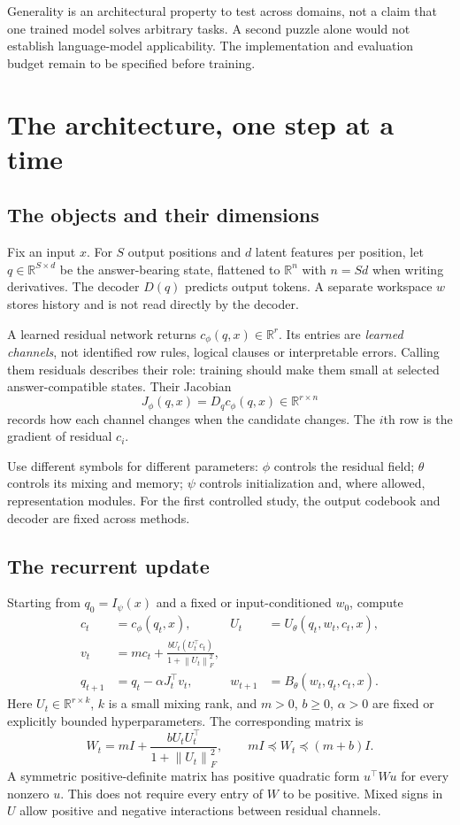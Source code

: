 \documentclass[11pt,a4paper]{article}
\newcommand{\norm}[1]{\left\lVert #1\right\rVert}
\newcommand{\newtopic}{\clearpage}
\begin{document}
Generality is an architectural property to test across domains, not a claim that one trained model solves arbitrary tasks. A second puzzle alone would not establish language-model applicability. The implementation and evaluation budget remain to be specified before training.


\newtopic
\section{The architecture, one step at a time}\label{sec:architecture}
\subsection{The objects and their dimensions}
Fix an input $x$. For $S$ output positions and $d$ latent features per position, let $q\in\mathbb R^{S\times d}$ be the answer-bearing state, flattened to $\mathbb R^n$ with $n=Sd$ when writing derivatives. The decoder $D(q)$ predicts output tokens. A separate workspace $w$ stores history and is not read directly by the decoder.

A learned residual network returns $c_\phi(q,x)\in\mathbb R^r$. Its entries are \emph{learned channels}, not identified row rules, logical clauses or interpretable errors. Calling them residuals describes their role: training should make them small at selected answer-compatible states. Their Jacobian
\[
J_\phi(q,x)=D_q c_\phi(q,x)\in\mathbb R^{r\times n}
\]
records how each channel changes when the candidate changes. The $i$th row is the gradient of residual $c_i$.

Use different symbols for different parameters: $\phi$ controls the residual field; $\theta$ controls its mixing and memory; $\psi$ controls initialization and, where allowed, representation modules. For the first controlled study, the output codebook and decoder are fixed across methods.

\subsection{The recurrent update}
Starting from $q_0=I_\psi(x)$ and a fixed or input-conditioned $w_0$, compute
\begin{align}
c_t&=c_\phi(q_t,x), & U_t&=U_\theta(q_t,w_t,c_t,x),\nonumber\\
v_t&=m c_t+\frac{bU_t(U_t^\top c_t)}{1+\norm{U_t}_F^2},\label{eq:mix}\\
q_{t+1}&=q_t-\alpha J_t^\top v_t, &
 w_{t+1}&=B_\theta(w_t,q_t,c_t,x).\label{eq:update}
\end{align}
Here $U_t\in\mathbb R^{r\times k}$, $k$ is a small mixing rank, and $m>0$, $b\ge0$, $\alpha>0$ are fixed or explicitly bounded hyperparameters. The corresponding matrix is
\[
W_t=mI+\frac{bU_tU_t^\top}{1+\norm{U_t}_F^2},\qquad
mI\preceq W_t\preceq(m+b)I.
\]
A symmetric positive-definite matrix has positive quadratic form $u^\top Wu$ for every nonzero $u$. This does not require every entry of $W$ to be positive. Mixed signs in $U$ allow positive and negative interactions between residual channels.
\end{document}
